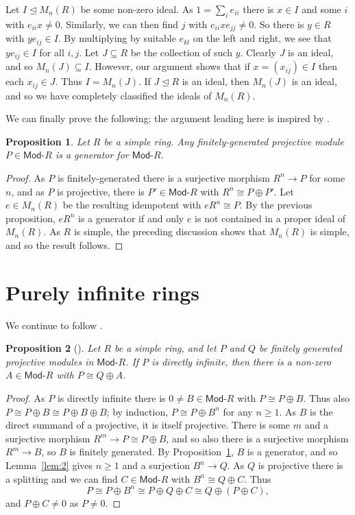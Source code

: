 \documentclass[a4paper,12pt]{article}
\theoremstyle{plain}
\newtheorem{proposition}{Proposition}[section]
\theoremstyle{definition}
\renewcommand{\mod}{\textsf{Mod-}}
\begin{document}
Let $I\trianglelefteq M_n(R)$ be some non-zero ideal.  As $1 = \sum_i e_{ii}$ there is $x\in I$ and some
$i$ with $e_{ii} x \not = 0$.  Similarly, we can then find $j$ with $e_{ii} x e_{jj} \not = 0$.  So there is
$y\in R$ with $y e_{ij} \in I$.  By multiplying by suitable $e_{kl}$ on the left and right, we see that
$y e_{ij} \in I$ for all $i,j$.  Let $J\subseteq R$ be the collection of such $y$.  Clearly $J$ is an ideal,
and so $M_n(J) \subseteq I$.  However, our argument shows that if $x = (x_{ij}) \in I$ then each $x_{ij} \in J$.
Thus $I = M_n(J)$.  If $J \trianglelefteq R$ is an ideal, then $M_n(J)$ is an ideal, and so we have completely
classified the ideals of $M_n(R)$.

We can finally prove the following; the argument leading here is inspired by \cite{qy2}.

\begin{proposition}\label{prop:1}
Let $R$ be a simple ring.  Any finitely-generated projective module $P\in\mod R$ is a generator for $\mod R$.
\end{proposition}
\begin{proof}
As $P$ is finitely-generated there is a surjective morphism $R^n \rightarrow P$ for some $n$, and as $P$ is
projective, there is $P'\in\mod R$ with $R^n \cong P \oplus P'$.  Let $e\in M_n(R)$ be the resulting idempotent
with $eR^n \cong P$.  By the previous proposition, $eR^n$ is a generator if and only $e$ is not contained in
a proper ideal of $M_n(R)$.  As $R$ is simple, the preceding discussion shows that $M_n(R)$ is simple, and
so the result follows.
\end{proof}


\section{Purely infinite rings}

We continue to follow \cite{agp}.

\begin{proposition}[{\cite[Lemma~1.4]{agp}}]\label{prop:2}
Let $R$ be a simple ring, and let $P$ and $Q$ be finitely generated projective modules in $\mod R$.
If $P$ is directly infinite, then there is a non-zero $A\in\mod R$ with $P \cong Q \oplus A$.
\end{proposition}
\begin{proof}
As $P$ is directly infinite there is $0\not=B\in\mod R$ with $P \cong P \oplus B$.  Thus also $P \cong
P \oplus B \cong P\oplus B\oplus B$; by induction, $P\cong P\oplus B^n$ for any $n\geq 1$.  As $B$ is
the direct summand of a projective, it is itself projective.  There is some $m$ and a surjective morphism
$R^m \rightarrow P \cong P\oplus B$, and so also there is a surjective morphism $R^m\rightarrow B$, so
$B$ is finitely generated.  By Proposition~\ref{prop:1}, $B$ is a generator, and so Lemma~\ref{lem:2}
gives $n\geq 1$ and a surjection $B^n \rightarrow Q$.  As $Q$ is projective there is a splitting and we
can find $C\in\mod R$ with $B^n \cong Q \oplus C$.  Thus
\[ P \cong P \oplus B^n \cong P \oplus Q \oplus C \cong Q \oplus (P\oplus C), \]
and $P\oplus C\not=0$ as $P\not=0$.
\end{proof}
\end{document}
